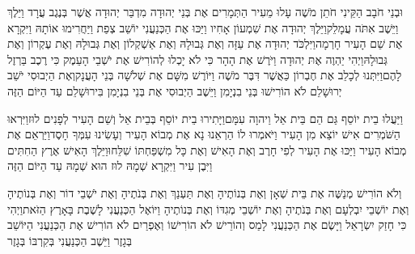 \documentclass[../main/main.tex]{subfiles}
\begin{document}
\begin{multicols*}{\ncols}
וּבְנֵי חֹבָב הַקֵּינִי\SubEnd{} חֹתֵן מֹשֶׁה עָלוּ מֵעִיר הַתְּמָרִים אֶת בְּנֵי יְהוּדָה מִדְבַּר יְהוּדָה אֲשֶׁר בְּנֶגֶב עֲרָד וַיֵּלֶךְ וַיֵּשֶׁב אִתֹּה עֲמָלֵק\SubEnd{}\PreVerseSpace{}וַיֵּלֶךְ יְהוּדָה אֶת שִׁמְעוֹן אָחִיו וַיַּכּוּ אֶת הַכְּנַעֲנִי יוֹשֵׁב צְפַת וַיַּחֲרִימוּ אוֹתָהּ וַיִּקְרָא אֶת שֵׁם הָעִיר חָרְמָה\PreVerseSpace{}וַיִּלְכֹּד יְהוּדָה אֶת עַזָּה וְאֶת גְּבוּלָהּ וְאֶת אַשְׁקְלוֹן וְאֶת גְּבוּלָהּ וְאֶת עֶקְרוֹן וְאֶת גְּבוּלָהּ\PreVerseSpace{}וַיְהִי יַהְוֶה אֶתּ יְהוּדָה וַיֹּרֶשׁ אֶת הָהָר כִּי לֹא יָכְלוּ\OmitEnd{} לְהוֹרִישׁ אֶת יֹשְׁבֵי הָעֵמֶק כִּי רֶכֶב בַּרְזֶל לָהֶם\PreVerseSpace{}וַיִּתְּנוּ לְכָלֵב אֶת חֶבְרוֹן כַּאֲשֶׁר דִּבֶּר מֹשֶׁה וַיּוֹרֶשׁ מִשָּׁם אֶת שְׁלֹשָׁה בְּנֵי הָעֲנָק\PreVerseSpace{}וְאֶת הַיְבוּסִי יֹשֵׁב יְרוּשָׁלֵם לֹא הוֹרִישׁוּ בְּנֵי בִנְיָמִן וַיֵּשֶׁב הַיְבוּסִי אֶת בְּנֵי בִנְיָמִן בִּירוּשָׁלֵם עַד הַיּוֹם הַזֶּה\OpenSection{}\par
{}וַיַּעֲלוּ בֵית יוֹסֵף גַּם הֵם בֵּית אֵל וַיהוָה עִמָּם\PreVerseSpace{}וַיָּתִירוּ בֵית יוֹסֵף בְּבֵית אֵל וְשֵׁם הָעִיר לְפָנִים לוּז\PreVerseSpace{}וַיִּרְאוּ הַשֹּׁמְרִים אִישׁ יוֹצֵא מִן הָעִיר וַיֹּאמְרוּ לוֹ הַרְאֵנוּ נָא אֶת מְבוֹא הָעִיר וְעָשִׂינוּ עִמְּךָ חָסֶד\PreVerseSpace{}וַיַּרְאֵם אֶת מְבוֹא הָעִיר וַיַּכּוּ אֶת הָעִיר לְפִי חָרֶב וְאֶת הָאִישׁ וְאֶת כָּל מִשְׁפַּחְתּוֹ שִׁלֵּחוּ\PreVerseSpace{}וַיֵּלֶךְ הָאִישׁ אֶרֶץ הַחִתִּים וַיִּבֶן עִיר וַיִּקְרָא שְׁמָהּ לוּז הוּא שְׁמָהּ עַד הַיּוֹם הַזֶּה\OpenSection{}\par
{}וְלֹא הוֹרִישׁ מְנַשֶּׁה אֶת בֵּית שְׁאָן וְאֶת בְּנוֹתֶיהָ וְאֶת תַּעְנַךְ וְאֶת בְּנֹתֶיהָ וְאֶת יֹשְׁבֵי\SubEnd{} דוֹר וְאֶת בְּנוֹתֶיהָ וְאֶת יוֹשְׁבֵי יִבְלְעָם וְאֶת בְּנֹתֶיהָ וְאֶת יוֹשְׁבֵי מְגִדּוֹ וְאֶת בְּנוֹתֶיהָ וַיּוֹאֶל הַכְּנַעֲנִי לָשֶׁבֶת בָּאָרֶץ הַזֹּאת\PreVerseSpace{}וַיְהִי כִּי חָזַק יִשְׂרָאֵל וַיָּשֶׂם אֶת הַכְּנַעֲנִי לָמַס וְהוֹרֵישׁ לֹא הוֹרִישׁוֹ \ClosedSection{}וְאֶפְרַיִם לֹא הוֹרִישׁ אֶת הַכְּנַעֲנִי הַיּוֹשֵׁב בְּגָזֶר וַיֵּשֶׁב הַכְּנַעֲנִי בְּקִרְבּוֹ בְּגָזֶר\OpenSection{}\par

\end{multicols*}
\end{document}
